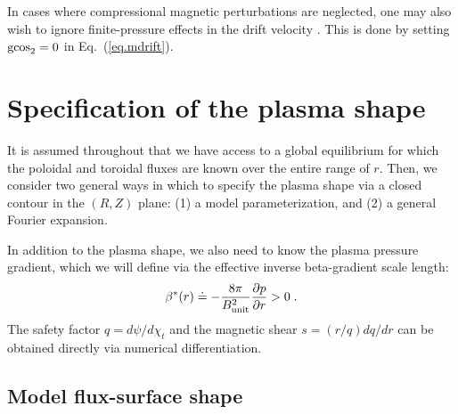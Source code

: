 In cases where compressional magnetic perturbations are neglected, 
one may also wish to ignore finite-pressure effects in the drift 
velocity \cite{waltz:1999}.  This is done by setting $\text{gcos}_2 = 0$ 
in Eq.~(\ref{eq.mdrift}). 

\clearpage

\section{Specification of the plasma shape}
\label{sec.shape}

It is assumed throughout that we have access to a global
equilibrium for which the poloidal and toroidal fluxes 
are known over the entire range of $r$.  Then, we consider 
two general ways in which to specify the plasma shape
via a closed contour in the $(R,Z)$ plane:  
(1) a model parameterization, and 
(2) a general Fourier expansion.

In addition to the plasma shape, we also need to know 
the plasma pressure gradient, which we will define 
via the effective inverse beta-gradient scale length:
%
\begin{equation}
\beta^*(r) \doteq -\frac{8\pi}{B_{\rm unit}^2} \frac{\partial p}{\partial r} > 0 \; .
\end{equation}
%
The safety factor $q=d\psi/d\chi_t$ and the magnetic shear 
$s=(r/q) dq/dr$ can be obtained directly via numerical differentiation.

\subsection{Model flux-surface shape}

